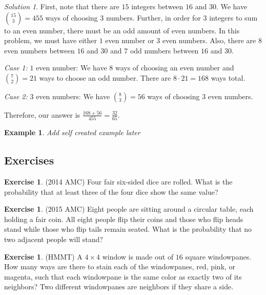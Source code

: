 \documentclass[letterpaper]{article}
\newtheorem{example}[thm]{Example}
\theoremstyle{remark}
\newtheorem*{solution}{Solution}
\theoremstyle{definition}
\newtheorem{exercise}[thm]{Exercise}
\begin{document}
\begin{solution}
First, note that there are $15$ integers between $16$ and $30$. We have $\binom{15}{3}=455$ ways of choosing $3$ numbers. Further, in order for $3$ integers to sum to an even number, there must be an odd amount of even numbers. In this problem, we must have either $1$ even number or $3$ even numbers. Also, there are $8$ even numbers between $16$ and $30$ and $7$ odd numbers between $16$ and $30$.
\newline

\textit{Case 1:} $1$ even number: We have $8$ ways of choosing an even number and $\binom{7}{2}=21$ ways to choose an odd number. There are $8\cdot 21=168$ ways total.
\newline

\textit{Case 2:} $3$ even numbers: We have $\binom{8}{3}=56$ ways of choosing $3$ even numbers. 
\newline

Therefore, our answer is $\frac{168+56}{455}=\frac{32}{65}$.

\end{solution}

\begin{example}
Add self created example later
\end{example}

\subsection*{Exercises}

\begin{exercise}
(2014 AMC) Four fair six-sided dice are rolled. What is the probability that at least three of the four dice show the same value?
\end{exercise}
 
\begin{exercise}
(2015 AMC) Eight people are sitting around a circular table, each holding a fair coin. All eight people flip their coins and those who flip heads stand while those who flip tails remain seated. What is the probability that no two adjacent people will stand?
\end{exercise}

\begin{exercise}
(HMMT) A $4\times 4$ window is made out of $16$ square windowpanes. How many ways are there to stain each of the windowpanes, red, pink, or magenta, such that each windowpane is the same color as exactly two of its neighbors? Two different windowpanes are neighbors if they share a side.
\end{exercise}
\end{document}
